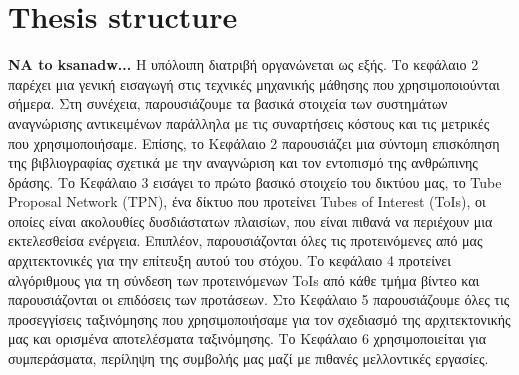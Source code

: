 \section{\en Thesis structure\gr}
\textbf{NA to ksanadw...}
Η υπόλοιπη διατριβή οργανώνεται ως εξής. Το κεφάλαιο 2 παρέχει μια γενική εισαγωγή στις τεχνικές μηχανικής μάθησης  που χρησιμοποιούνται σήμερα.
Στη συνέχεια, παρουσιάζουμε τα βασικά στοιχεία των συστημάτων αναγνώρισης αντικειμένων παράλληλα με τις συναρτήσεις κόστους  και τις μετρικές που χρησιμοποιήσαμε.
Επίσης, το Κεφάλαιο 2 παρουσιάζει μια σύντομη επισκόπηση της βιβλιογραφίας σχετικά με την αναγνώριση και τον εντοπισμό της ανθρώπινης δράσης.
Το Κεφάλαιο 3 εισάγει το πρώτο βασικό στοιχείο του δικτύου μας, το \en Tube Proposal Network (TPN)\gr, ένα δίκτυο που προτείνει \en Tubes of Interest (ToIs)\gr,
οι οποίες είναι ακολουθίες δυσδιάστατων πλαισίων, που είναι πιθανά να περιέχουν μια εκτελεσθείσα ενέργεια.
Επιπλέον, παρουσιάζονται  όλες τις προτεινόμενες από μας αρχιτεκτονικές για την επίτευξη αυτού του στόχου.
Το κεφάλαιο 4 προτείνει αλγόριθμους για τη σύνδεση των προτεινόμενων \en ToIs \gr από κάθε τμήμα βίντεο και παρουσιάζονται οι επιδόσεις των προτάσεων.
Στο Κεφάλαιο 5 παρουσιάζουμε όλες τις προσεγγίσεις ταξινόμησης που χρησιμοποιήσαμε για τον σχεδιασμό της αρχιτεκτονικής μας και ορισμένα αποτελέσματα ταξινόμησης.
Το Κεφάλαιο 6 χρησιμοποιείται για συμπεράσματα, περίληψη της συμβολής μας μαζί με πιθανές μελλοντικές εργασίες.

% 
